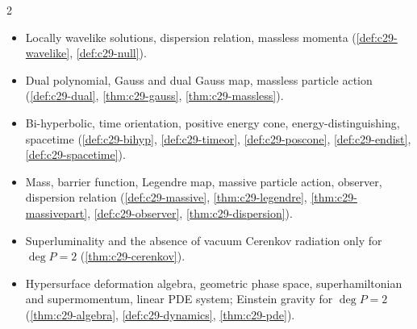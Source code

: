 \begin{paracol}{2}
\begin{keyconcepts}
\begin{itemize}
  \item Locally wavelike solutions, dispersion relation, massless momenta (\cref{def:c29-wavelike}, \cref{def:c29-null}).
  \item Dual polynomial, Gauss and dual Gauss map, massless particle action (\cref{def:c29-dual}, \cref{thm:c29-gauss}, \cref{thm:c29-massless}).
  \item Bi-hyperbolic, time orientation, positive energy cone, energy-distinguishing, spacetime (\cref{def:c29-bihyp}, \cref{def:c29-timeor}, \cref{def:c29-poscone}, \cref{def:c29-endist}, \cref{def:c29-spacetime}).
  \item Mass, barrier function, Legendre map, massive particle action, observer, dispersion relation (\cref{def:c29-massive}, \cref{thm:c29-legendre}, \cref{thm:c29-massivepart}, \cref{def:c29-observer}, \cref{thm:c29-dispersion}).
  \item Superluminality and the absence of vacuum Cerenkov radiation only for $\deg P=2$ (\cref{thm:c29-cerenkov}).
  \item Hypersurface deformation algebra, geometric phase space, superhamiltonian and supermomentum, linear PDE system; Einstein gravity for $\deg P=2$ (\cref{thm:c29-algebra}, \cref{def:c29-dynamics}, \cref{thm:c29-pde}).
\end{itemize}
\end{keyconcepts}

\flushside
\end{paracol}
